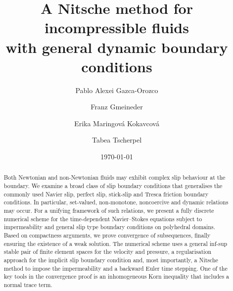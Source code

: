 \documentclass[reqno,a4paper]{amsart}
\begin{document}
	
	\title[A Nitsche method for fluids with dynamic boundary conditions]{A Nitsche method for incompressible fluids \\ with general dynamic boundary conditions
	}
	
	\author[P.A.~Gazca-Orozco]{Pablo Alexei Gazca-Orozco}
	\author[F.~Gmeineder]{Franz Gmeineder}
	\author[E.~Maringov\'a Kokavcov\'{a}]{{Erika  Maringov\'a Kokavcov\'a}}
	\author[T.~Tscherpel]{Tabea Tscherpel}
	
	\address[P.\ A. Gazca-Orozco]{Department of Applied Mathematics, University of Freiburg, 79104, Freiburg, Germany}
	\address[F. Gmeineder]{Fachbereich Mathematik und Statistik, Universität Konstanz, Universitätsstr.~10, 78464 Konstanz, Germany.}
	\address[E. Maringov\'{a} Kokavcov\'{a}]{{Institute of Science and Technology Austria (ISTA), Am Campus 1, 3400 Klosterneuburg, Austria}}
	\address[T.\ Tscherpel]{Department of Mathematics, Technische Universit\"at Darmstadt, Dolivostraße 15, 64293 Darmstadt, Germany}
	
	
	
	\date{\today}
	
	\maketitle
	\setcounter{tocdepth}{1} 	
	\begin{abstract} 
		Both Newtonian and non-Newtonian fluids may exhibit complex slip behaviour at the boundary.  
		We {examine} a broad class of slip boundary conditions that generalises the commonly used Navier slip, perfect slip, stick-slip and Tresca friction boundary conditions. 
		In particular, set-valued, non-monotone, noncoercive and dynamic relations may occur. For a unifying framework of such relations, we present a fully discrete numerical scheme for the time-dependent Navier--Stokes equations subject to impermeability and general slip type boundary conditions on polyhedral domains. 
		Based on compactness arguments, we prove convergence of subsequences, finally ensuring the existence of a weak solution. 
		The numerical scheme uses a general inf-sup stable pair of finite element spaces for the velocity and pressure, a regularisation approach for the implicit slip boundary condition and, most importantly, a Nitsche method to impose the impermeability and a backward Euler time stepping. 
		One of the key tools in the convergence proof is an inhomogeneous Korn inequality that includes a normal trace term. 
	\end{abstract}
	
\end{document}
